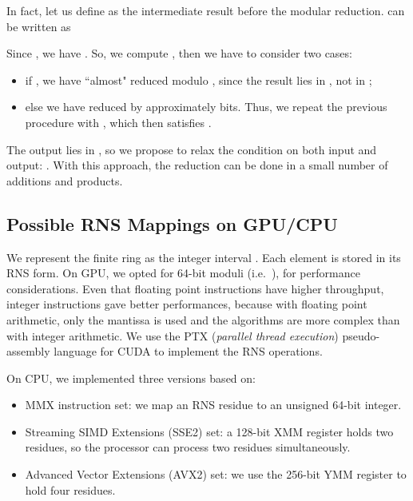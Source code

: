 \documentclass[runningheads,orivec]{llncs}
\begin{document}
In fact, let us define  as the intermediate result before the modular reduction.  can be written as

Since , we have
.
So, we compute , then we have to consider two cases:
\begin{itemize}
\item if , we have ``almost" reduced  modulo , since the result lies in , not in ;
\item else we have reduced  by approximately  bits. Thus, we repeat the previous procedure with , which then satisfies .
\end{itemize} 

The output lies in , so we propose to relax the condition on both input and output: . With this approach, the reduction can be done in a small number of additions and products.







\vspace*{-0.25cm}

\subsection{Possible RNS Mappings on GPU/CPU}
\vspace*{-0.25cm}

We represent the finite ring  as the integer interval . Each element is stored in its RNS form. On GPU, we opted for 64-bit moduli (i.e.~), for performance considerations. Even that floating point instructions have higher throughput, integer instructions gave better performances, because with floating point arithmetic, only the mantissa is used and the algorithms are more complex than with integer arithmetic. We use the PTX (\textit{parallel thread execution}) pseudo-assembly language for CUDA \cite{PTX30} to implement the RNS operations.
\medskip

On CPU, we implemented three versions based on:
\vspace*{-0.25cm}
\begin{itemize}
\item MMX instruction set: we map an RNS residue to an unsigned 64-bit integer.
\item Streaming SIMD Extensions (SSE2) set: a 128-bit XMM register holds two residues, so the processor can process two residues simultaneously.\item Advanced Vector Extensions (AVX2) set: we use the 256-bit YMM register to hold four residues. 
\end{itemize} 
\end{document}
